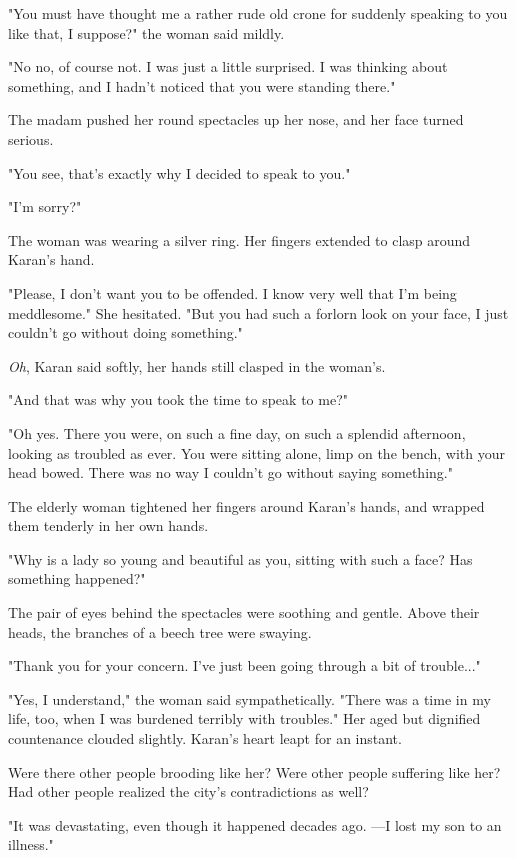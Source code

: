 "You must have thought me a rather rude old crone for suddenly speaking
to you like that, I suppose?" the woman said mildly.

"No no, of course not. I was just a little surprised. I was thinking
about something, and I hadn't noticed that you were standing there."

The madam pushed her round spectacles up her nose, and her face turned
serious.

"You see, that's exactly why I decided to speak to you."

"I'm sorry?"

The woman was wearing a silver ring. Her fingers extended to clasp
around Karan's hand.

"Please, I don't want you to be offended. I know very well that I'm
being meddlesome." She hesitated. "But you had such a forlorn look on
your face, I just couldn't go without doing something."

\emph{Oh}, Karan said softly, her hands still clasped in the woman's.

"And that was why you took the time to speak to me?"

"Oh yes. There you were, on such a fine day, on such a splendid
afternoon, looking as troubled as ever. You were sitting alone, limp on
the bench, with your head bowed. There was no way I couldn't go without
saying something."

The elderly woman tightened her fingers around Karan's hands, and
wrapped them tenderly in her own hands.

"Why is a lady so young and beautiful as you, sitting with such a face?
Has something happened?"

The pair of eyes behind the spectacles were soothing and gentle. Above
their heads, the branches of a beech tree were swaying.

"Thank you for your concern. I've just been going through a bit of
trouble..."

"Yes, I understand," the woman said sympathetically. "There was a time
in my life, too, when I was burdened terribly with troubles." Her aged
but dignified countenance clouded slightly. Karan's heart leapt for an
instant.

Were there other people brooding like her? Were other people suffering
like her? Had other people realized the city's contradictions as well?

"It was devastating, even though it happened decades ago. ---I lost my son
to an illness."

